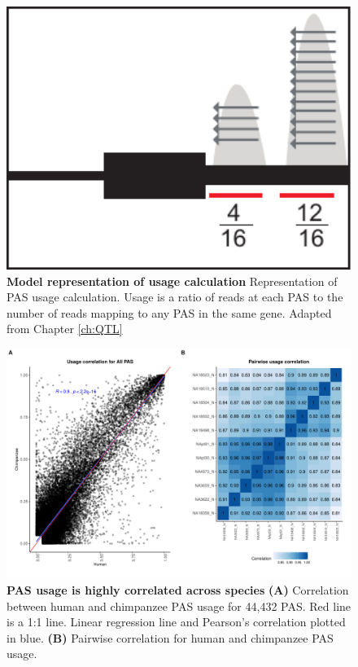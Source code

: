 \begin{figure}[!htb]
\centering
\includegraphics[width=5in]{img/ch03/Fig1-figSup2.pdf}
\caption[Model representation of usage calculation]{\textbf{Model representation of usage calculation} Representation of PAS usage calculation. Usage is a ratio of reads at each PAS to the number of reads mapping to any PAS in the same gene. Adapted from Chapter \ref{ch:QTL}}
\label{fig:ch03-UsageCalc}
\end{figure}
\clearpage

\begin{figure}[!htb]
\centering
\includegraphics[width=5in]{img/ch03/Fig1-figSup3.pdf}
\caption[PAS usage is highly correlated across species]{\textbf{PAS usage is highly correlated across species} {\bf (A)}  Correlation between human and chimpanzee PAS usage for 44,432 PAS. Red line is a 1:1 line. Linear regression line and Pearson's correlation plotted in blue. {\bf (B)}  Pairwise correlation for human and chimpanzee PAS usage.}
\label{fig:ch03-UsageCorr}
\end{figure}
\clearpage

